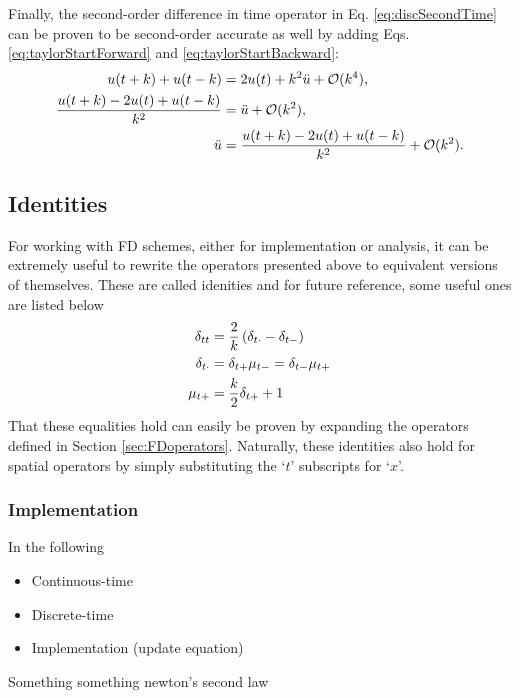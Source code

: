 Finally, the second-order difference in time operator in Eq. \eqref{eq:discSecondTime} can be proven to be second-order accurate as well by adding Eqs. \eqref{eq:taylorStartForward} and \eqref{eq:taylorStartBackward}:
\begin{align}
    u(t+k) + u(t-k) &= 2 u(t) + k^2 \ddot u + \mathcal{O}(k^4),\nonumber\\
    \frac{u(t+k) -2 u(t) + u(t-k)}{k^2} &= \ddot u + \mathcal{O}(k^2),\nonumber\\
    \ddot u &= \frac{u(t+k) -2 u(t) + u(t-k)}{k^2} + \mathcal{O}(k^2).
\end{align}

\subsection{Identities}
For working with FD schemes, either for implementation or analysis, it can be extremely useful to rewrite the operators presented above to equivalent versions of themselves. These are called idenities and for future reference, some useful ones are listed below
\begin{subequations}
    \begin{align}
        \delta_{tt} &= \frac{2}{k}\left(\delta_{t\cdot}- \delta_{t-}\right)\label{eq:identity1}\\
        \delta_{t\cdot} &= \delta_{t+}\mu_{t-} = \delta_{t-}\mu_{t+}\label{eq:identity2}\\
        \mu_{t+} &= \frac{k}{2}\delta_{t+} + 1\label{eq:identity3}
    \end{align}
\end{subequations}
That these equalities hold can easily be proven by expanding the operators defined in Section \ref{sec:FDoperators}. Naturally, these identities also hold for spatial operators by simply substituting the `$t$' subscripts for `$x$'. 

\subsubsection{Implementation}
In the following 
\begin{itemize}
    \item Continuous-time
    \item Discrete-time
    \item Implementation (update equation)
\end{itemize}


Something something newton's second law

